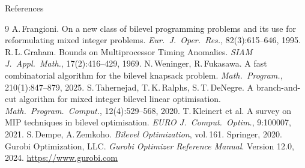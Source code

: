 \documentclass[fleqn,11pt,aspectratio=43]{beamer}
\begin{document}
\appendix

\begin{frame}[allowframebreaks]{References}
  \footnotesize
  \begin{thebibliography}{9}
      A.\,Frangioni. On a new class of bilevel programming problems and its use
      for reformulating mixed integer problems.
      \textit{Eur.~J.~Oper.~Res.}, 82(3):615--646, 1995.
      R.\,L.\,Graham. Bounds on Multiprocessor Timing Anomalies.
      \textit{SIAM J.\ Appl.\ Math.}, 17(2):416--429, 1969.
      N.\,Weninger, R.\,Fukasawa. A fast combinatorial algorithm for the bilevel knapsack problem.
      \textit{Math.\ Program.}, 210(1):847--879, 2025.
      S.\,Tahernejad, T.\,K.\,Ralphs, S.\,T.\,DeNegre. A branch-and-cut algorithm for mixed
      integer bilevel linear optimisation.
      \textit{Math.\ Program.\ Comput.}, 12(4):529--568, 2020.
      T.\,Kleinert et al. A survey on MIP techniques in bilevel optimisation.
      \textit{EURO J.\ Comput.\ Optim.}, 9:100007, 2021.
      S.\,Dempe, A.\,Zemkoho. \textit{Bilevel Optimization}, vol.\,161. Springer, 2020.
      Gurobi Optimization, LLC. \textit{Gurobi Optimizer Reference Manual}. Version 12.0, 2024.
      \url{https://www.gurobi.com}
  \end{thebibliography}
\end{frame}
\end{document}
